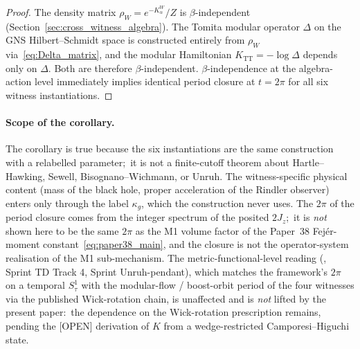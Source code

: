\documentclass[11pt,a4paper]{article}
\theoremstyle{plain}
\theoremstyle{definition}
\newcommand{\TT}{\mathrm{TT}}
\begin{document}
\begin{proof}
The density matrix $\rho_W = e^{-K_\alpha^W}/Z$ is
$\beta$-independent (Section~\ref{sec:cross_witness_algebra}). The
Tomita modular operator $\Delta$ on the GNS Hilbert--Schmidt space is
constructed entirely from $\rho_W$ via~\eqref{eq:Delta_matrix},
and the modular Hamiltonian $K_{\TT} = -\log \Delta$ depends only on
$\Delta$. Both are therefore $\beta$-independent.
$\beta$-independence at the algebra-action level immediately implies
identical period closure at $t = 2\pi$ for all six witness
instantiations.
\end{proof}

\paragraph{Scope of the corollary.}
The corollary is true because the six instantiations are the same
construction with a relabelled parameter;\ it is not a finite-cutoff
theorem about Hartle--Hawking, Sewell, Bisognano--Wichmann, or Unruh.
The witness-specific physical content (mass of the black hole, proper
acceleration of the Rindler observer) enters only through the label
$\kappa_g$, which the construction never uses.  The $2\pi$ of the
period closure comes from the integer spectrum of the posited $2J_z$;\
it is \emph{not} shown here to be the same $2\pi$ as the M1 volume
factor of the Paper~38 Fej\'er-moment constant~\eqref{eq:paper38_main}, and the
closure is not the operator-system
realisation of the M1 sub-mechanism.
The metric-functional-level reading
(\cite[Rem.~rem:bisognano\_wichmann\_reading]{paper32}, Sprint TD
Track 4, Sprint Unruh-pendant), which matches the framework's $2\pi$
on a temporal $S^1_\tau$ with the modular-flow / boost-orbit period
of the four witnesses via the published Wick-rotation chain, is
unaffected and is \emph{not} lifted by the present paper:\ the
dependence on the Wick-rotation prescription remains, pending the
[OPEN] derivation of $K$ from a wedge-restricted Camporesi--Higuchi
state.
\end{document}
